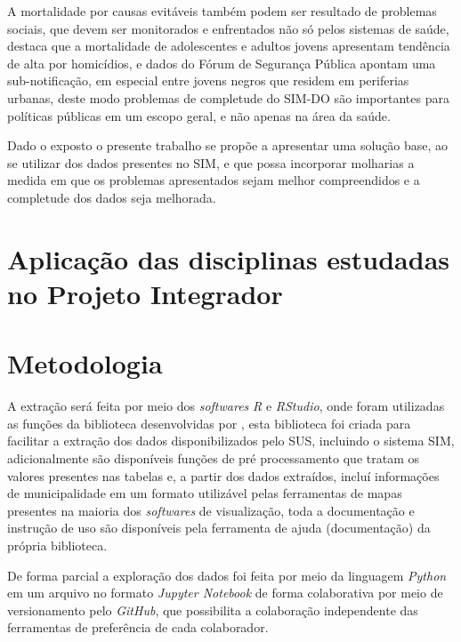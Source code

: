 A mortalidade por causas evitáveis também podem ser resultado de problemas sociais, que devem ser monitorados e enfrentados não só pelos sistemas de saúde,  destaca que a mortalidade de adolescentes e adultos jovens apresentam tendência de alta por homicídios, e dados do  Fórum de Segurança Pública apontam uma sub-notificação, em especial entre jovens negros que residem em periferias urbanas, deste modo problemas de completude do SIM-DO são importantes para políticas públicas em um escopo geral, e não apenas na área da saúde.

Dado o exposto o presente trabalho se propõe a apresentar uma solução base, ao se utilizar dos dados presentes no SIM, e que possa incorporar molharias a medida em que os problemas apresentados sejam melhor compreendidos e a completude dos dados seja melhorada.



 

\section{Aplicação das disciplinas estudadas no Projeto Integrador}


\section{Metodologia}

A extração será feita por meio dos \textit{softwares} \textit{R} e \textit{RStudio}, onde foram utilizadas as funções da biblioteca desenvolvidas por , esta biblioteca foi criada para facilitar a extração dos dados disponibilizados pelo SUS, incluindo o sistema SIM, adicionalmente são disponíveis funções de pré processamento que tratam os valores presentes nas tabelas e, a partir dos dados extraídos, incluí informações de municipalidade em um formato utilizável pelas ferramentas de mapas presentes na maioria dos \textit{softwares} de visualização, toda a documentação e instrução de uso são disponíveis pela ferramenta de ajuda (documentação) da própria biblioteca.

De forma parcial a exploração dos dados foi feita por meio da linguagem \textit{Python} em um arquivo no formato \textit{Jupyter Notebook} de forma colaborativa por meio de versionamento pelo \textit{GitHub}, que possibilita a colaboração independente das ferramentas de preferência de cada colaborador.

